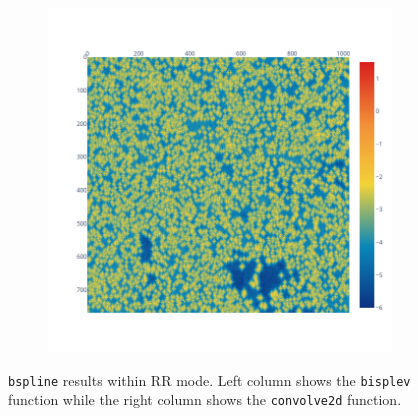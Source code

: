\documentclass[11pt]{article}
\begin{document}
\begin{figure}
\begin{subfigure}{0.3\linewidth}
    \caption{}
    \label{fig:bspline_convol2d_mean}
\end{subfigure}
\begin{subfigure}{0.3\linewidth}
    \includegraphics[width=\linewidth]{figure/bspline/convol2d_ret_std_log_portland.png}
    \caption{}
    \label{fig:bspline_convol2d_std}
\end{subfigure}
    \label{fig:bspline_rr}
    \caption{\texttt{bspline} results within RR mode. Left column shows the \texttt{bisplev} function
    while the right column shows the \texttt{convolve2d} function. }
\end{figure}
\end{document}
